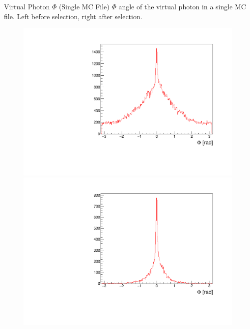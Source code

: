 \documentclass[10pt]{beamer}
\begin{document}
\begin{frame}{Virtual Photon $\Phi$ (Single MC File)}
$\Phi$ angle of the virtual photon in a single MC file. Left before selection, right after selection.

\begin{figure}
	\centering
	\begin{minipage}{.5\textwidth}
		\centering
		\includegraphics[width=\textwidth]{gg/Phigg_BS}

	\end{minipage}%
	\begin{minipage}{.5\textwidth}
		\centering
		\includegraphics[width=\textwidth]{gg/Phigg_AS}

	\end{minipage}
\end{figure}
\end{frame}
\end{document}
